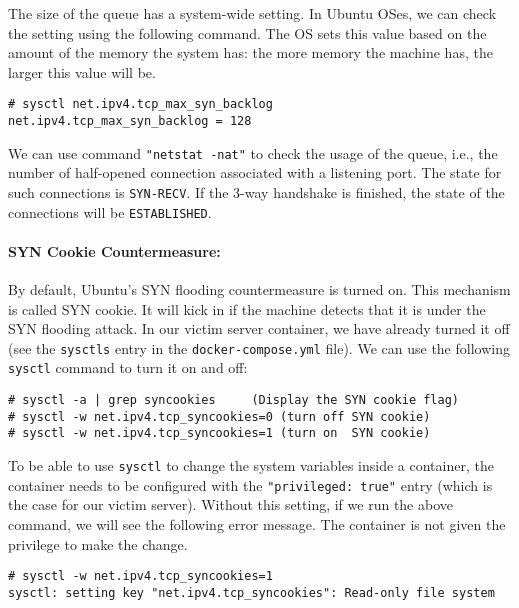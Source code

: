The size of the queue has a system-wide setting.  In Ubuntu OSes, we can check the
setting using the following command. The OS sets this value based on
the amount of the memory the system has: the more memory the machine has, 
the larger this value will be.

\begin{lstlisting}
# sysctl net.ipv4.tcp_max_syn_backlog
net.ipv4.tcp_max_syn_backlog = 128
\end{lstlisting}

We can use command \texttt{"netstat -nat"} to check the usage of the queue, 
i.e., the number of half-opened connection associated with a listening port. 
The state for such connections is \texttt{SYN-RECV}. If the 3-way handshake
is finished, the state of the connections will be \texttt{ESTABLISHED}. 

\paragraph{SYN Cookie Countermeasure:}
By default, Ubuntu's SYN flooding countermeasure is turned on. This 
mechanism is called SYN cookie. It will kick in if the machine
detects that it is under the SYN flooding attack. In our 
victim server container, we have already turned it off (see the 
\texttt{sysctls} entry in the \texttt{docker-compose.yml} file).  
We can use the following \texttt{sysctl} command to turn it on and off:

\begin{lstlisting}
# sysctl -a | grep syncookies     (Display the SYN cookie flag) 
# sysctl -w net.ipv4.tcp_syncookies=0 (turn off SYN cookie)
# sysctl -w net.ipv4.tcp_syncookies=1 (turn on  SYN cookie)
\end{lstlisting}

To be able to use \texttt{sysctl} to change the system variables 
inside a container, the container needs to be 
configured with the \texttt{"privileged: true"} entry (which is the 
case for our victim server). 
Without this setting, if we run the above command,
we will see the following error message. The container
is not given the privilege to make the change. 

\begin{lstlisting}
# sysctl -w net.ipv4.tcp_syncookies=1
sysctl: setting key "net.ipv4.tcp_syncookies": Read-only file system
\end{lstlisting}





